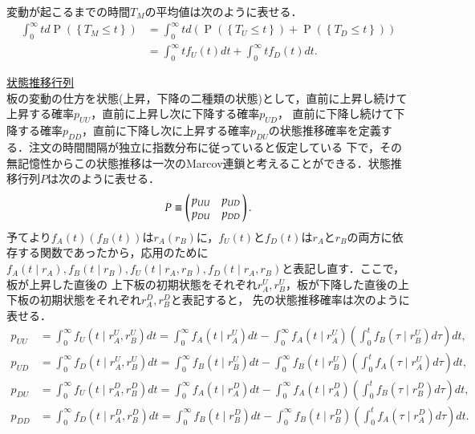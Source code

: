 \documentclass[a4j,papersize,disablejfam,slide,14pt]{jsarticle}
\def\prob#1{\operatorname{P} \left(\left\{ #1 \right\}\right)} %
\begin{document}
    変動が起こるまでの時間$T_M$の平均値は次のように表せる．
    \begin{align}
    	\int_{0}^{\infty} t d\prob{T_M \leq t} &= \int_{0}^{\infty} t d(\prob{T_U \leq t} + \prob{T_D \leq t}) \\
        &= \int_{0}^{\infty} t f_U(t) dt + \int_{0}^{\infty} t f_D(t) dt.
    \end{align}
    
\underline{\large 状態推移行列}\\
    板の変動の仕方を状態(上昇，下降の二種類の状態)として，直前に上昇し続けて上昇する確率$p_{UU}$，直前に上昇し次に下降する確率$p_{UD}$，
    直前に下降し続けて下降する確率$p_{DD}$，直前に下降し次に上昇する確率$p_{DU}$の状態推移確率を定義する．注文の時間間隔が独立に指数分布に従っていると仮定している
    下で，その無記憶性からこの状態推移は一次の{\rm Marcov}連鎖と考えることができる．状態推移行列$P$は次のように表せる．
    \begin{align}
    	P \equiv \left(
    	\begin{array}{@{\,}cc@{\,}}
    		p_{UU} & p_{UD} \\
            p_{DU} & p_{DD}
    	\end{array}
    	\right). \\
    \end{align}
    予てより$f_A(t)(f_B(t))$は$r_A(r_B)$に，$f_U(t)$と$f_D(t)$は$r_A$と$r_B$の両方に依存する関数であったから，応用のために
    $f_A(t \mid r_A), f_B(t \mid r_B), f_U(t \mid r_A, r_B), f_D(t \mid r_A, r_B)$と表記し直す．ここで，板が上昇した直後の
    上下板の初期状態をそれぞれ$r_A^U, r_B^U$，板が下降した直後の上下板の初期状態をそれぞれ$r_A^D, r_B^D$と表記すると，
    先の状態推移確率は次のように表せる．
    \begin{align}
    	p_{UU} &= \int_{0}^{\infty} f_U(t \mid r_A^U, r_B^U) dt = \int_{0}^{\infty} f_A(t \mid r_A^U)dt - \int_{0}^{\infty} f_A(t \mid r_A^U) \left( \int_{0}^{t} f_B(\tau \mid r_B^U)d\tau \right) dt, \\
        p_{UD} &= \int_{0}^{\infty} f_D(t \mid r_A^U, r_B^U) dt = \int_{0}^{\infty} f_B(t \mid r_B^U)dt - \int_{0}^{\infty} f_B(t \mid r_B^U) \left( \int_{0}^{t} f_A(\tau \mid r_A^U)d\tau \right) dt, \\
        p_{DU} &= \int_{0}^{\infty} f_U(t \mid r_A^D, r_B^D) dt = \int_{0}^{\infty} f_A(t \mid r_A^D)dt - \int_{0}^{\infty} f_A(t \mid r_A^D) \left( \int_{0}^{t} f_B(\tau \mid r_B^D)d\tau \right) dt, \\
        p_{DD} &= \int_{0}^{\infty} f_D(t \mid r_A^D, r_B^D) dt = \int_{0}^{\infty} f_B(t \mid r_B^D)dt - \int_{0}^{\infty} f_B(t \mid r_B^D) \left( \int_{0}^{t} f_A(\tau \mid r_A^D)d\tau \right) dt.
    \end{align}
    
\end{document}
